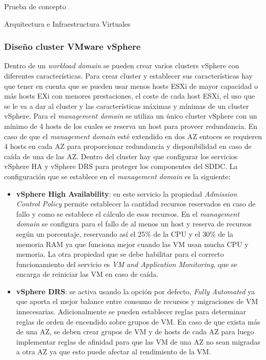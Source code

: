 \begin{section}{Prueba de concepto}
\begin{subsection}{Arquitectura e Infraestructura Virtuales\cite{CFVirtInfraes}}
\subsubsection{Diseño cluster VMware vSphere}
Dentro de un \textit{workload domain} se pueden crear varios clusters vSphere con diferentes características. Para crear cluster y establecer sus características hay que tener en cuenta que se pueden usar menos hosts ESXi de mayor capacidad o más hosts EXi con menores prestaciones, el coste de cada host ESXi, el uso que se le va a dar al cluster y las características máximas y mínimas de un cluster vSphere. Para el \textit{management domain} se utiliza un único cluster vSphere con un mínimo de 4 hosts de los cuales se reserva un host para proveer redundancia. En caso de que el \textit{management domain} esté extendido en dos AZ entoces se requieren 4 hosts en cada AZ para proporcionar redundancia y disponibilidad en caso de caída de una de las AZ.
Dentro del cluster hay que configurar los servicios vSphere HA y vSphere DRS para proteger los componentes del SDDC. La configuración que se establece en el \textit{management domain} es la siguiente:
\begin{itemize}
    \item \textbf{vSphere High Availability}: en este servicio la propiedad \textit{Admission Control Policy} permite establecer la cantidad recursos reservados en caso de fallo y como se establece el cálculo de esos recursos. En el \textit{management domain} se configura para el fallo de al menos un host y reserva de recursos según un porcentaje, reservando así el 25\% de la CPU y el 30\% de la memoria RAM ya que funciona mejor cuando las VM usan mucha CPU y memoria. La otra propiedad que se debe habilitar para el correcto funcionamiento del servicio es \textit{VM and Application Monitoring}, que se encarga de reiniciar las VM en caso de caída.
    \item \textbf{vSphere DRS}: se activa usando la opción por defecto, \textit{Fully Automated} ya que aporta el mejor balance entre consumo de recursos y migraciones de VM innecesarias. Adicionalmente se pueden establecer reglas para determinar reglas de orden de encendido sobre grupos de VM. En caso de que exista más de una AZ, se deben crear grupos de VM y de hosts de cada AZ para luego implementar reglas de afinidad para que las VM de una AZ no sean migradas a otra AZ ya que esto puede afectar al rendimiento de la VM. 
\end{itemize}

\end{subsection}
\end{section}
